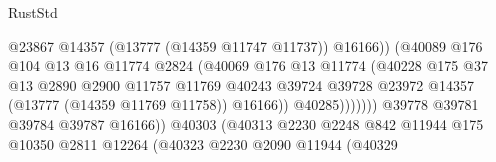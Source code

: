 \begin{lexlean}{RustStd}
\begin{coremodule}
                                                  @23867
                                                  @14357
                                                  (@13777 (@14359 @11747 @11737))
                                                  @16166))
                                              (@40089
                                                @176
                                                @104
                                                @13
                                                @16
                                                @11774
                                                @2824
                                                (@40069
                                                  @176
                                                  @13
                                                  @11774
                                                  (@40228
                                                    @175
                                                    @37
                                                    @13
                                                    @2890
                                                    @2900
                                                    @11757
                                                    @11769
                                                    @40243
                                                    @39724
                                                    @39728
                                                    @23972
                                                    @14357
                                                    (@13777 (@14359 @11769 @11758))
                                                    @16166))
                                                @40285)))))))
                                  @39778
                                  @39781
                                  @39784
                                  @39787
                                  @16166))
                              @40303
                              (@40313
                                @2230
                                @2248
                                @842
                                @11944
                                @175
                                @10350
                                @2811
                                @12264
                                (@40323
                                  @2230
                                  @2090
                                  @11944
                                  (@40329

\end{coremodule}
\end{lexlean}
